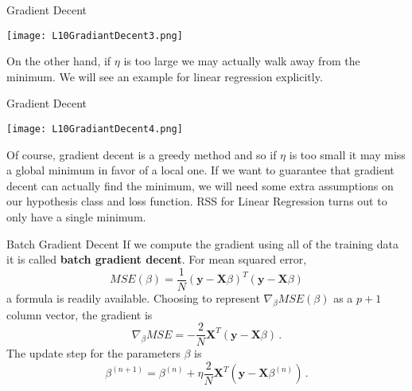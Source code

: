 \documentclass[10pt, table, dvipsnames,xcdraw, handout]{beamer}
\newcommand{\bfX}{\ensuremath{\mathbf{X}}}
\newcommand{\bfy}{\ensuremath{\mathbf{y}}}
\begin{document}
\begin{frame}[fragile]{Gradient Decent}
  \begin{minipage}[t][0.5\textheight][t]{\textwidth}
	\centering \texttt{[image: L10GradiantDecent3.png]} 
  \end{minipage}
  \vfill
\begin{minipage}[t][0.5\textheight][t]{\textwidth}
On the other hand, if $\eta$ is too large we may actually walk away from the minimum. \pause We will see an example for linear regression explicitly. 
\end{minipage}
\end{frame}




\begin{frame}[fragile]{Gradient Decent}
  \begin{minipage}[t][0.5\textheight][t]{\textwidth}
	\centering \texttt{[image: L10GradiantDecent4.png]} 
  \end{minipage}
  \vfill
\begin{minipage}[t][0.5\textheight][t]{\textwidth}
Of course, gradient decent is a greedy method and so if $\eta$ is too small it may miss a global minimum in favor of a local one. \pause If we want to guarantee that gradient decent can actually find the minimum, we will need some extra assumptions on our hypothesis class and loss function. RSS for Linear Regression turns out to only have a single minimum. 
\end{minipage}
\end{frame}





\begin{frame}[fragile]{Batch Gradient Decent}
If we compute the gradient using all of the training data it is called \textbf{batch gradient decent}. For mean squared error, 
$$
MSE(\beta) = \frac{1}{N}(\bfy  - \bfX\beta)^T (\bfy  - \bfX\beta)
$$ 
a formula is readily available. \pause Choosing to represent $\nabla_\beta MSE(\beta)$ as a $p+1$ column vector, the gradient is
$$
\nabla_\beta MSE = -\frac{2}{N}\bfX^T (\bfy  - \bfX\beta)\,.
$$ \pause
The update step for the parameters $\beta$ is
$$
\beta^{(n+1)} = \beta^{(n)} +\eta \frac{2}{N}\bfX^T (\bfy  - \bfX\beta^{(n)})\,.
$$

\end{frame}
\end{document}
